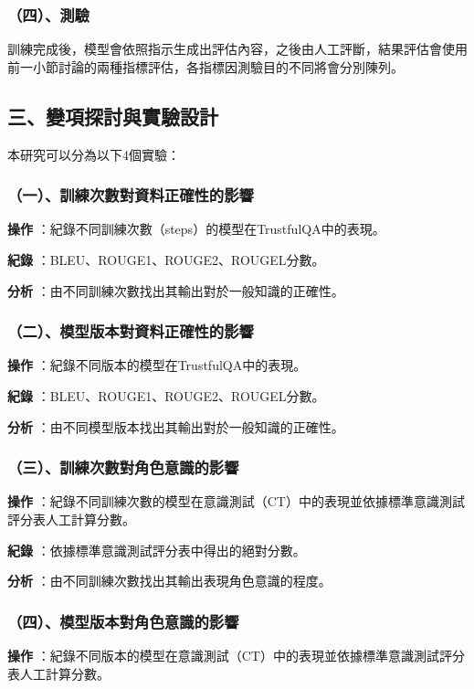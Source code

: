 \documentclass[12pt,a4paper,MingLiU,UTF8,natbib]{article}
\def\xeCJKembold{0.4}
\def\saveCJKnode{\dimen255\lastkern}
\def\restoreCJKnode{\kern-\dimen255\kern\dimen255}
\let\CJKoldsymbol\CJKsymbol
\let\CJKoldpunctsymbol\CJKpunctsymbol
\def\CJKfakeboldsymbol#1{%
	\special{pdf:literal direct 2 Tr \xeCJKembold\space w}%
	\CJKoldsymbol{#1}%
	\saveCJKnode
	\special{pdf:literal direct 0 Tr}%
	\restoreCJKnode}
\def\CJKfakeboldpunctsymbol#1{%
	\special{pdf:literal direct 2 Tr \xeCJKembold\space w}%
	\CJKoldpunctsymbol{#1}%
	\saveCJKnode
	\special{pdf:literal direct 0 Tr}%
	\restoreCJKnode}
\newcommand\CJKfakebold[1]{%
	\let\CJKsymbol\CJKfakeboldsymbol
	\let\CJKpunctsymbol\CJKfakeboldpunctsymbol
	#1%
	\let\CJKsymbol\CJKoldsymbol
	\let\CJKpunctsymbol\CJKoldpunctsymbol}
\begin{document}
	\subsubsection{（四）、測驗}
	訓練完成後，模型會依照指示生成出評估內容，之後由人工評斷，結果評估會使用前一小節討論的兩種指標評估，各指標因測驗目的不同將會分別陳列。
	\subsection{三、變項探討與實驗設計}
	本研究可以分為以下4個實驗：
	\subsubsection{（一）、訓練次數對資料正確性的影響}
	\CJKfakebold{\textbf{操作}}：紀錄不同訓練次數（steps）的模型在TrustfulQA中的表現。
	
	\CJKfakebold{\textbf{紀錄}}：BLEU、ROUGE1、ROUGE2、ROUGEL分數。
	
	\CJKfakebold{\textbf{分析}}：由不同訓練次數找出其輸出對於一般知識的正確性。
	
	\subsubsection{（二）、模型版本對資料正確性的影響}
	\CJKfakebold{\textbf{操作}}：紀錄不同版本的模型在TrustfulQA中的表現。

	\CJKfakebold{\textbf{紀錄}}：BLEU、ROUGE1、ROUGE2、ROUGEL分數。

	\CJKfakebold{\textbf{分析}}：由不同模型版本找出其輸出對於一般知識的正確性。
	
	\subsubsection{（三）、訓練次數對角色意識的影響}
	\CJKfakebold{\textbf{操作}}：紀錄不同訓練次數的模型在意識測試（CT）中的表現並依據標準意識測試評分表人工計算分數。

	\CJKfakebold{\textbf{紀錄}}：依據標準意識測試評分表中得出的絕對分數。

	\CJKfakebold{\textbf{分析}}：由不同訓練次數找出其輸出表現角色意識的程度。
	
	\subsubsection{（四）、模型版本對角色意識的影響}
	\CJKfakebold{\textbf{操作}}：紀錄不同版本的模型在意識測試（CT）中的表現並依據標準意識測試評分表人工計算分數。
\end{document}
